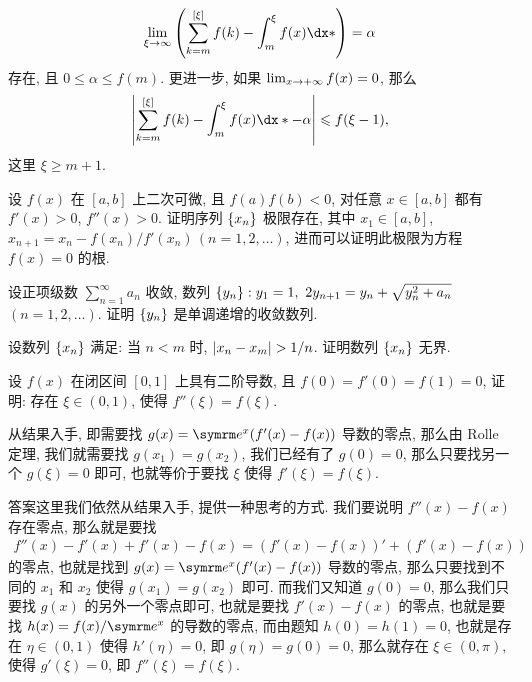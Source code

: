 \begin{exercise}[series=exer]
\begin{exercise}
      \begin{align*}
          \limit{\xi}{\infty} \qty(\sum_{k = m}^{[\xi]} f(k) - \int_{m}^{\xi} f(x) \dx*) = \alpha
      \end{align*}
      存在, 且 $ 0 \le \alpha \le f(m) $. 更进一步, 如果 $ \lim_{x \to +\infty} f(x) = 0 $, 那么
      \begin{align*}
          \abs{\sum_{k = m}^{[\xi]} f(k) - \int_{m}^{\xi} f(x) \dx* - \alpha} \le f(\xi - 1),
      \end{align*}
      这里 $ \xi \ge m + 1 $.
  \end{exercise}
  \item 设 $ f(x) $ 在 $ [a, b] $ 上二次可微, 且 $ f(a)f(b) < 0 $, 对任意 $ x \in [a, b] $ 都有 $ f'(x) > 0 $, $ f''(x) > 0 $. 证明序列 $ \qty{x_{n}} $ 极限存在, 其中 $ x_{1} \in [a, b] $, $ x_{n + 1} = x_{n} - f(x_{n})/f'(x_{n})\,(n = 1, 2, \dots) $, 进而可以证明此极限为方程 $ f(x) = 0 $ 的根.
  \item 设正项级数 $ \sum_{n = 1}^{\infty} a_{n} $ 收敛, 数列 $ \qty{y_{n}} : y_{1} = 1,\ 2y_{n + 1} = y_{n} + \sqrt{y_{n}^{2} + a_{n}} $\, $ (n = 1, 2, \dots) $. 证明 $ \qty{y_{n}} $ 是单调递增的收敛数列.
  \item 设数列 $ \qty{x_{n}} $ 满足: 当 $ n < m $ 时, $ \abs{x_{n} - x_{m}} > 1/n $. 证明数列 $ \qty{x_{n}} $ 无界.
  \item 设 $ f(x) $ 在闭区间 $ [0, 1] $ 上具有二阶导数, 且 $ f(0) = f'(0) = f(1) = 0 $, 证明: 存在 $ \xi \in (0, 1) $, 使得 $ f''(\xi) = f(\xi) $.
  \begin{hint}
      从结果入手, 即需要找 $ g(x) = \me^{x}(f'(x) - f(x)) $ 导数的零点, 那么由 Rolle 定理, 我们就需要找 $ g(x_{1}) = g(x_{2}) $, 我们已经有了 $ g(0) = 0 $, 那么只要找另一个 $ g(\xi) = 0 $ 即可, 也就等价于要找 $ \xi $ 使得 $ f'(\xi) = f(\xi) $.
  \end{hint}
  \begin{answer}
      答案这里我们依然从结果入手, 提供一种思考的方式. 我们要说明 $ f''(x) - f(x) $ 存在零点, 那么就是要找
      \begin{align*}
          f''(x) - f'(x) + f'(x) - f(x) = (f'(x) - f(x))' + (f'(x) - f(x))
      \end{align*}
      的零点, 也就是找到 $ g(x) = \me^{x}(f'(x) - f(x)) $ 导数的零点, 那么只要找到不同的 $ x_{1} $ 和 $ x_{2} $ 使得 $ g(x_{1}) = g(x_{2}) $ 即可. 而我们又知道 $ g(0) = 0 $, 那么我们只要找 $ g(x) $ 的另外一个零点即可, 也就是要找 $ f'(x) - f(x) $ 的零点, 也就是要找 $ h(x) = f(x)/\me^{x} $ 的导数的零点, 而由题知 $ h(0) = h(1) = 0 $, 也就是存在 $ \eta\in(0, 1) $ 使得 $ h'(\eta) = 0 $, 即 $ g(\eta) = g(0) = 0 $, 那么就存在 $ \xi \in (0, \pi) $, 使得 $ g'(\xi) = 0 $, 即 $ f''(\xi) = f(\xi) $.

\end{answer}
\end{exercise}
